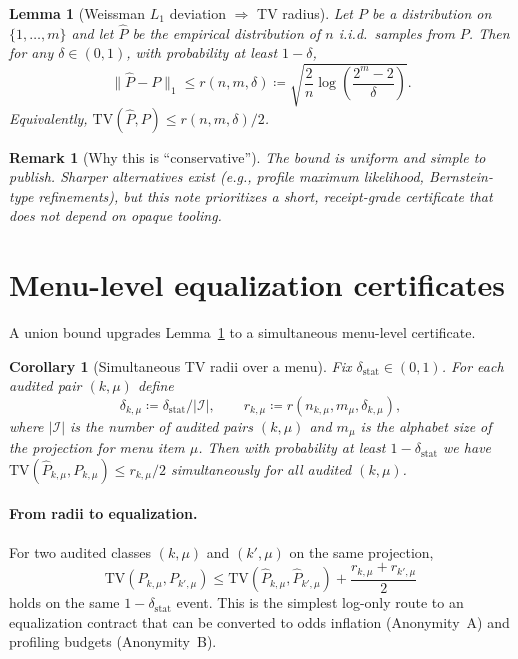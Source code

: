 \documentclass[11pt]{article}
\newtheorem{lemma}{Lemma}
\newtheorem{corollary}{Corollary}
\newtheorem{remark}{Remark}
\newcommand{\TV}{\mathrm{TV}}
\begin{document}
\begin{lemma}[Weissman $L_1$ deviation $\Rightarrow$ TV radius]\label{lem:weissman}
Let $P$ be a distribution on $\{1,\dots,m\}$ and let $\widehat P$ be the empirical distribution of $n$ i.i.d.\ samples from $P$.
Then for any $\delta\in(0,1)$, with probability at least $1-\delta$,
\[
\|\widehat P-P\|_1 \le r(n,m,\delta)\coloneqq \sqrt{\frac{2}{n}\log\!\left(\frac{2^m-2}{\delta}\right)}.
\]
Equivalently, $\TV(\widehat P,P)\le r(n,m,\delta)/2$.
\end{lemma}

\begin{remark}[Why this is ``conservative'']
The bound is uniform and simple to publish.
Sharper alternatives exist (e.g., profile maximum likelihood, Bernstein-type refinements),
but this note prioritizes a short, receipt-grade certificate that does not depend on opaque tooling.
\end{remark}

\section{Menu-level equalization certificates}
A union bound upgrades Lemma~\ref{lem:weissman} to a simultaneous menu-level certificate.

\begin{corollary}[Simultaneous TV radii over a menu]\label{cor:menu}
Fix $\delta_{\mathrm{stat}}\in(0,1)$.
For each audited pair $(k,\mu)$ define
\[
\delta_{k,\mu}\coloneqq \delta_{\mathrm{stat}} / |\mathcal I|,\qquad
r_{k,\mu}\coloneqq r(n_{k,\mu},m_\mu,\delta_{k,\mu}),
\]
where $|\mathcal I|$ is the number of audited pairs $(k,\mu)$ and $m_\mu$ is the alphabet size of the projection for menu item $\mu$.
Then with probability at least $1-\delta_{\mathrm{stat}}$ we have
$\TV(\widehat P_{k,\mu},P_{k,\mu})\le r_{k,\mu}/2$ simultaneously for all audited $(k,\mu)$.
\end{corollary}

\paragraph{From radii to equalization.}
For two audited classes $(k,\mu)$ and $(k',\mu)$ on the same projection,
\[
\TV(P_{k,\mu},P_{k',\mu})
\le
\TV(\widehat P_{k,\mu},\widehat P_{k',\mu}) + \frac{r_{k,\mu}+r_{k',\mu}}{2}
\]
holds on the same $1-\delta_{\mathrm{stat}}$ event.
This is the simplest log-only route to an equalization contract that can be converted to odds inflation (Anonymity~A) and profiling budgets (Anonymity~B). \cite{series:oddsinflation,series:profiling}
\end{document}
